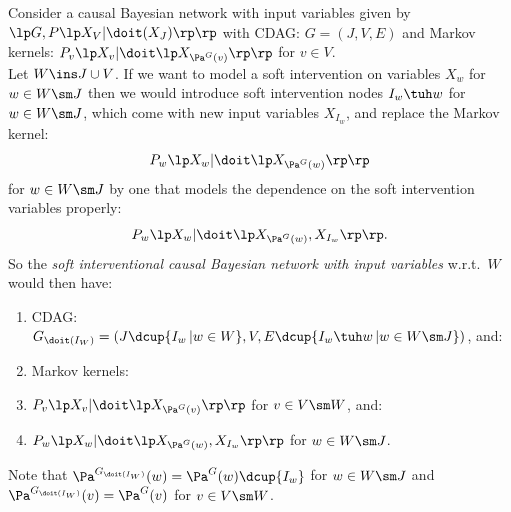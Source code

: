 \begin{Rem}
    \label{I-CBN-soft-int}
    Consider a  causal Bayesian network with input variables given by $\lp G, P\lp X_V|\doit(X_J)\rp\rp$ 
    with CDAG: $G=(J,V,E)$ and Markov kernels: $P_v\lp X_v|\doit\lp X_{\Pa^G(v)}\rp\rp$ for $v \in V$.\\
    Let $W \ins J \cup V$.
    If we want to model a soft intervention on variables $X_w$ for $w \in W\sm J$ then we would introduce 
    soft intervention nodes $I_w \tuh w$ for $w \in W \sm J$, which come with new input variables $X_{I_w}$, 
    and replace 
    the Markov kernel: 
    \[P_w\lp X_w|\doit\lp X_{\Pa^G(w)}\rp\rp\]
    for $w \in W\sm J$ by one that models the dependence on the 
    soft intervention variables properly:
    \[  P_w\lp X_w|\doit\lp X_{\Pa^G(w)},X_{I_w}\rp\rp. \]
    So the \emph{soft interventional causal Bayesian network with input variables} w.r.t.\ $W$ would then have: 
        \begin{enumerate}
            \item CDAG: $G_{\doit(I_W)} = (J \dcup \{I_w\,|w \in W\}, V, E \dcup \{I_w \tuh w\,|w \in W\sm J\}) $, and:
        \item Markov kernels: 
        \item[] $P_v\lp X_v|\doit\lp X_{\Pa^G(v)}\rp\rp$ for $v \in V \sm W$, and:
        \item[] $P_w\lp X_w|\doit\lp X_{\Pa^G(w)}, X_{I_w}\rp\rp$ for $w \in W\sm J$.
    \end{enumerate}
    Note that $\Pa^{G_{\doit(I_W)}}(w)= \Pa^G(w) \dcup \{I_w\}$ for $w \in W\sm J$ and 
    $\Pa^{G_{\doit(I_W)}}(v)= \Pa^G(v)$ for $v \in V \sm W$. 
\end{Rem}

